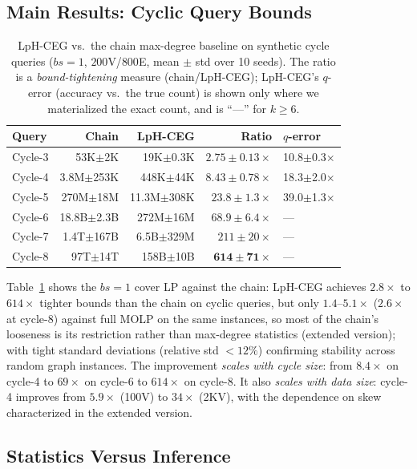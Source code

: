 \documentclass[conference]{IEEEtran}
\begin{document}
\subsection{Main Results: Cyclic Query Bounds}

\begin{table}[t]
\centering
\caption{LpH-CEG vs.\ the chain max-degree baseline on synthetic cycle queries ($bs{=}1$,
$200$V/$800$E, mean $\pm$ std over 10 seeds).
The ratio is a \emph{bound-tightening} measure (chain/LpH-CEG);
LpH-CEG's $q$-error (accuracy vs.\ the true count) is shown only where we
materialized the exact count, and is ``---'' for $k \ge 6$.}
\label{tab:synthetic}
\begin{tabular}{@{}lrrrl@{}}
\toprule
Query & Chain & LpH-CEG & Ratio & $q$-error \\
\midrule
Cycle-3 &  53K$\pm$2K  &  19K$\pm$0.3K & $2.75{\pm}0.13\times$ & 10.8$\pm$0.3$\times$ \\
Cycle-4 & 3.8M$\pm$253K & 448K$\pm$44K & $8.43{\pm}0.78\times$ & 18.3$\pm$2.0$\times$ \\
Cycle-5 & 270M$\pm$18M  & 11.3M$\pm$308K & $23.8{\pm}1.3\times$ & 39.0$\pm$1.3$\times$ \\
Cycle-6 & 18.8B$\pm$2.3B & 272M$\pm$16M & $68.9{\pm}6.4\times$ & --- \\
Cycle-7 & 1.4T$\pm$167B & 6.5B$\pm$329M & $211{\pm}20\times$ & --- \\
Cycle-8 & 97T$\pm$14T  & 158B$\pm$10B & $\mathbf{614{\pm}71\times}$ & --- \\
\bottomrule
\end{tabular}
\end{table}

Table~\ref{tab:synthetic} shows the $bs{=}1$ cover LP against the chain: LpH-CEG achieves
$2.8\times$ to $614\times$ tighter bounds than the chain on cyclic
queries, but only $1.4$--$5.1\times$ ($2.6\times$ at cycle-$8$) against full MOLP on the same instances, so most of the chain's looseness is its restriction rather than max-degree statistics (extended version); with tight standard deviations (relative std $< 12\%$)
confirming stability across random graph instances.
The improvement \emph{scales with cycle size}: from $8.4\times$
on cycle-4 to $69\times$ on cycle-6 to $614\times$ on cycle-8.
It also \emph{scales with data size}: cycle-4 improves from $5.9\times$
(100V) to $34\times$ (2KV), with the dependence on skew characterized in the extended version.

\subsection{Statistics Versus Inference}
\label{sec:stats-vs-inference}
\end{document}

